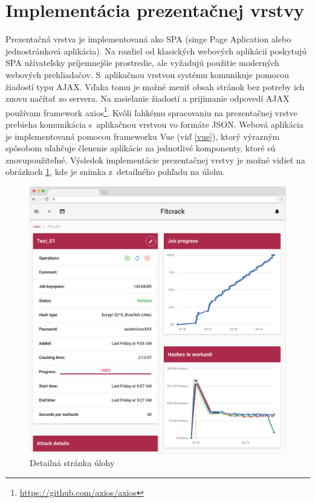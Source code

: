 \documentclass[slovak]{fitthesis}
\begin{document}
\section{Implementácia prezentačnej vrstvy}


Prezentačná vrstva je implementovaná ako SPA (singe Page Aplication alebo jednostránková aplikácia). Na rozdiel od klasických webových aplikácií poskytujú SPA užívateľsky príjemnejšie prostredie, ale vyžadujú použitie moderných webových prehliadačov. S~aplikačnou vrstvou systému komunikuje pomocou žiadostí typu AJAX. Vďaka tomu je možné meniť obsah stránok bez potreby ich znovu načítať zo servera. Na zasielanie žiadostí a prijímanie odpovedí AJAX používam framework axios\footnote{\url{https://github.com/axios/axios}}. Kvôli ľahkému spracovaniu na prezentačnej vrstve prebieha komunikácia s~aplikačnou vrstvou vo formáte JSON. Webová aplikácia je implementovaná pomocou frameworku Vue (viď \ref{vue}), ktorý výrazným spôsobom uľahčuje členenie aplikácie na jednotlivé komponenty, ktoré sú znovupoužiteľné. Výsledok implementácie prezentačnej vrstvy je možné vidieť na obrázkoch \ref{fig:detailPage}, kde je snímka z~detailného pohľadu na úlohu.
\begin{figure}[H]
    \centering
    \includegraphics[scale=0.25]{obrazky/jobDetail2Frame.PNG}
    \caption{Detailná stránka úlohy}
    \label{fig:detailPage}
\end{figure}
\end{document}
